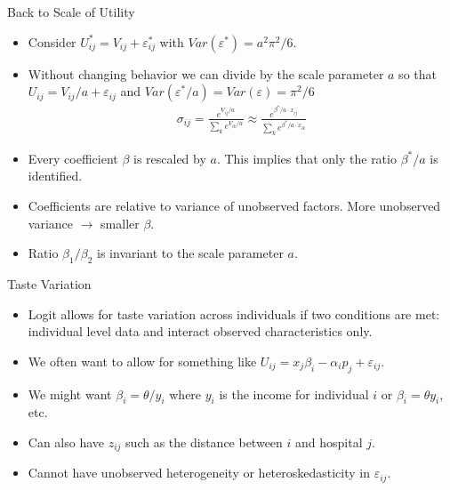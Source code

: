 \documentclass[aspectratio=169,11pt]{beamer}
\begin{document}
\begin{frame}{Back to Scale of Utility}
\begin{itemize}
\item Consider $U_{ij}^{*} = V_{ij} + \varepsilon_{ij}^{*}$ with $Var(\varepsilon^{*}) = a^2 \pi^2/6$.
\item Without changing behavior we can divide by the scale parameter $a$ so that $U_{ij} = V_{ij}/a + \varepsilon_{ij}$ and $Var(\varepsilon^{*}/a)=Var(\varepsilon) = \pi^2/6$
\begin{eqnarray*}
\sigma_{ij} = \frac{e^{V_{ij}/a}}{\sum_k e^{V_{ik}/a}} \approx \frac{e^{\beta^{*}/a \cdot x_{ij}}}{\sum_k e^{\beta^{*}/a \cdot x_{ik}}}
\end{eqnarray*}
\item Every coefficient $\beta$ is rescaled by $a$. This implies that only the ratio $\beta^{*}/a$ is identified.
\item Coefficients are relative to variance of unobserved factors. More unobserved variance $\longrightarrow$ smaller $\beta$.
\item Ratio $\beta_1/\beta_2$ is invariant to the scale parameter $a$.
\end{itemize}
\end{frame}

\begin{frame}{Taste Variation}
\begin{itemize}
\item Logit allows for taste variation across individuals if two conditions are met: \alert{individual level data} and \alert{interact observed characteristics} only.
\item We often want to allow for something like $U_{ij} = x_{j} \beta_i - \alpha_i p_j + \varepsilon_{ij}$. 
\item We might want $\beta_i = \theta / y_i$ where $y_i$ is the income for individual $i$ or $\beta_i = \theta y_i$, etc.
\item Can also have $z_{ij}$ such as the distance between $i$ and hospital $j$.
\item Cannot have unobserved heterogeneity or heteroskedasticity in $\varepsilon_{ij}$.
\end{itemize}
\end{frame}
\end{document}
